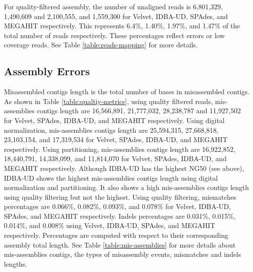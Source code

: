 For quality-filtered assembly, the number of unaligned reads is 6,801,329, 1,490,609 and 2,100,555, and 1,559,300 for Velvet, IDBA-UD, SPAdes, and MEGAHIT respectively. This represents 6.4\%, 1.40\%, 1.97\%, and 1.47\% of the total number of reads respectively. These percentages reflect errors or low coverage reads. See Table \ref{table:reads-mapping} for more details. 

\subsection*{Assembly Errors} 

Misassembled contigs length is the total number of bases in misassembled contigs.  As shown in Table \ref {table:qualtiy-metrics}, using quality filtered reads, mis-assemblies contigs length are 16,566,891, 21,777,032, 28,238,787 and 11,927,502 for Velvet, SPAdes, IDBA-UD, and MEGAHIT respectively. 
Using digital normalization,  mis-assemblies contigs length are 25,594,315, 27,668,818, 23,103,154, and 17,319,534 for Velvet, SPAdes, IDBA-UD, and MEGAHIT respectively.  Using partitioning,  mis-assemblies contigs length are 16,922,852, 18,440,791, 14,338,099, and 11,814,070 for Velvet, SPAdes, IDBA-UD, and MEGAHIT respectively. 
Although IDBA-UD has the highest NG50 (see above), IDBA-UD shows the highest mis-assemblies contigs length using digital normalization and partitioning. It also shows a high mis-assemblies contigs length using quality filtering but not the highest.
Using quality filtering, mismatches percentages are 0.066\%, 0.082\%, 0.093\%, and 0.078\% for Velvet, IDBA-UD, SPAdes, and MEGAHIT respectively. Indels percentages are 0.031\%, 0.015\%, 0.014\%, and 0.008\% using Velvet, IDBA-UD, SPAdes, and MEGAHIT respectively. Percentages are computed with respect to their corresponding assembly total length. See Table \ref{table:mis-assemblies}  for more details about mis-assemblies contigs, the types of misassembly events, mismatches and indels lengths.



